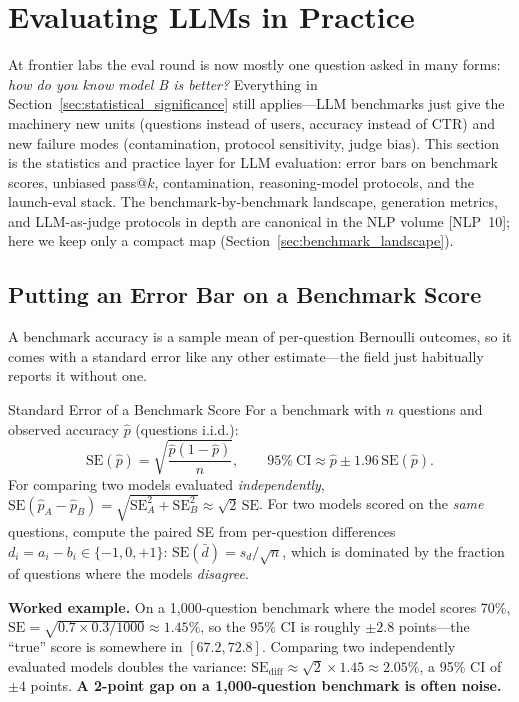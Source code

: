 \section{Evaluating LLMs in Practice}
\label{sec:llm_eval_practice}

At frontier labs the eval round is now mostly one question asked in many forms: \textit{how do you know model B is better?} Everything in Section~\ref{sec:statistical_significance} still applies---LLM benchmarks just give the machinery new units (questions instead of users, accuracy instead of CTR) and new failure modes (contamination, protocol sensitivity, judge bias). This section is the statistics and practice layer for LLM evaluation: error bars on benchmark scores, unbiased pass@$k$, contamination, reasoning-model protocols, and the launch-eval stack. The benchmark-by-benchmark landscape, generation metrics, and LLM-as-judge protocols in depth are canonical in the NLP volume [NLP~10]; here we keep only a compact map (Section~\ref{sec:benchmark_landscape}).

\subsection{Putting an Error Bar on a Benchmark Score}
\label{sec:benchmark_error_bars}

A benchmark accuracy is a sample mean of per-question Bernoulli outcomes, so it comes with a standard error like any other estimate---the field just habitually reports it without one.

\begin{mathresult}{Standard Error of a Benchmark Score}
For a benchmark with $n$ questions and observed accuracy $\hat{p}$ (questions i.i.d.):
\[
\text{SE}(\hat{p}) = \sqrt{\frac{\hat{p}(1-\hat{p})}{n}},
\qquad
95\%\ \text{CI} \approx \hat{p} \pm 1.96\,\text{SE}(\hat{p}).
\]
For comparing two models evaluated \textit{independently}, $\text{SE}(\hat{p}_A - \hat{p}_B) = \sqrt{\text{SE}_A^2 + \text{SE}_B^2} \approx \sqrt{2}\,\text{SE}$. For two models scored on the \textit{same} questions, compute the paired SE from per-question differences $d_i = a_i - b_i \in \{-1, 0, +1\}$: $\text{SE}(\bar{d}) = s_d / \sqrt{n}$, which is dominated by the fraction of questions where the models \textit{disagree}.
\end{mathresult}

\textbf{Worked example.} On a 1{,}000-question benchmark where the model scores 70\%, $\text{SE} = \sqrt{0.7 \times 0.3 / 1000} \approx 1.45\%$, so the 95\% CI is roughly $\pm 2.8$ points---the ``true'' score is somewhere in $[67.2, 72.8]$. Comparing two independently evaluated models doubles the variance: $\text{SE}_{\text{diff}} \approx \sqrt{2} \times 1.45 \approx 2.05\%$, a 95\% CI of $\pm 4$ points. \textbf{A 2-point gap on a 1{,}000-question benchmark is often noise.}

